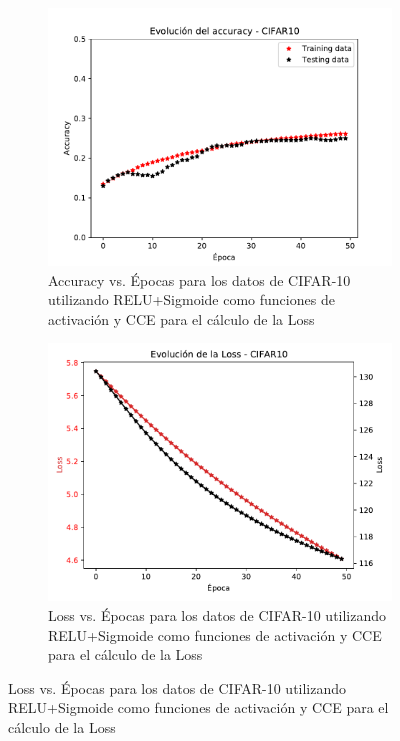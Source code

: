 \begin{figure}[H]
\begin{subfigure}[b]{0.45\textwidth}
         \label{fig:loss6a}
     \end{subfigure}
    \begin{subfigure}[b]{0.45\textwidth}
         \centering
         \includegraphics[width=\textwidth]{image/EJ5_Acc_RELU_SIG_SMAX.pdf}
         \caption{Accuracy vs. Épocas para los datos de CIFAR-10 utilizando RELU+Sigmoide como funciones de activación y CCE para el cálculo de la Loss}
         \label{fig:acc6a}
     \end{subfigure}
     \hfill
     \begin{subfigure}[b]{0.45\textwidth}
         \centering
         \includegraphics[width=\textwidth]{image/EJ5_Loss_RELU_SIG_SMAX.pdf}
         \caption{Loss vs. Épocas para los datos de CIFAR-10 utilizando RELU+Sigmoide como funciones de activación y CCE para el cálculo de la Loss}
         \label{fig:loss6a}
     \end{subfigure}
\end{figure}

